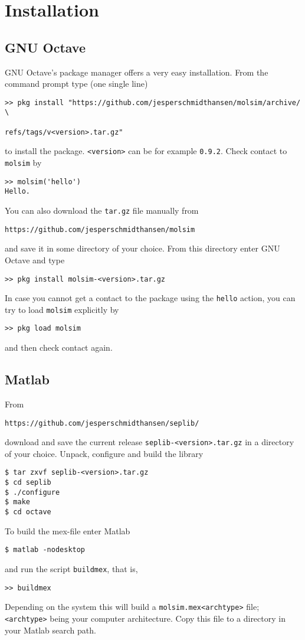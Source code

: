 \documentclass[11pt]{article}
\begin{document}
\section{Installation}\label{sec:install}
\subsection{GNU Octave}
GNU Octave's package manager offers a very easy installation. From the command
prompt type (one single line)
\begin{verbatim} 
>> pkg install "https://github.com/jesperschmidthansen/molsim/archive/ \
                                             refs/tags/v<version>.tar.gz"
\end{verbatim}
to install the package. \verb!<version>! can be for example \verb!0.9.2!. Check
contact to \verb!molsim! by
\begin{verbatim}
>> molsim('hello')
Hello. 
\end{verbatim}
You can also download the \verb!tar.gz! file manually from
\begin{verbatim}
https://github.com/jesperschmidthansen/molsim
\end{verbatim}
and save it in some directory of your choice. From this directory enter GNU
Octave and type
\begin{verbatim}
>> pkg install molsim-<version>.tar.gz 
\end{verbatim}
In case you cannot get a contact to the package using the \verb!hello! action, you can
try to load \verb!molsim! explicitly by 
\begin{verbatim}
>> pkg load molsim
\end{verbatim}
and then check contact again.

\subsection{Matlab}
From
\begin{verbatim}
https://github.com/jesperschmidthansen/seplib/
\end{verbatim}
\noindent download and save the current release \verb!seplib-<version>.tar.gz!
in a directory of your choice. Unpack, configure and build the library
\begin{verbatim}
$ tar zxvf seplib-<version>.tar.gz
$ cd seplib
$ ./configure
$ make
$ cd octave
\end{verbatim}
To build the \textsf{mex}-file enter Matlab
\begin{verbatim}
$ matlab -nodesktop
\end{verbatim}
and run the script \verb!buildmex!, that is, 
\begin{verbatim}
>> buildmex
\end{verbatim}
Depending on the system this will build a \verb!molsim.mex<archtype>!  file;
\verb!<archtype>! being your computer architecture. Copy this file to a
directory in your Matlab search path.
\end{document}
